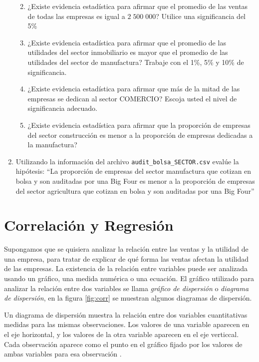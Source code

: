 \documentclass[letterpaper,]{book}
\providecommand{\tightlist}{%
  \setlength{\itemsep}{0pt}\setlength{\parskip}{0pt}}
\begin{document}
\begin{enumerate}
  \begin{enumerate}
  \def\labelenumii{\alph{enumii}.}
  \tightlist
  \item
    ¿Existe evidencia estadística para afirmar que el promedio de las ventas de todas las empresas es igual a \(2\;500\;000\)? Utilice una significancia del 5\%
  \item
    ¿Existe evidencia estadística para afirmar que el promedio de las utilidades del sector inmobiliario es mayor que el promedio de las utilidades del sector de manufactura? Trabaje con el 1\%, 5\% y 10\% de significancia.
  \item
    ¿Existe evidencia estadística para afirmar que más de la mitad de las empresas se dedican al sector COMERCIO? Escoja usted el nivel de significancia adecuado.
  \item
    ¿Existe evidencia estadística para afirmar que la proporción de empresas del sector construcción es menor a la proporción de empresas dedicadas a la manufactura?
  \end{enumerate}
\item
  Utilizando la información del archivo \texttt{audit\_bolsa\_SECTOR.csv} evalúe la hipótesis: ``La proporción de empresas del sector manufactura que cotizan en bolsa y son auditadas por una Big Four es menor a la proporción de empresas del sector agricultura que cotizan en bolsa y son auditadas por una Big Four''
\end{enumerate}

\hypertarget{methods}{%
\chapter{Correlación y Regresión}\label{methods}}

Supongamos que se quisiera analizar la relación entre las ventas y la utilidad de una empresa, para tratar de explicar de qué forma las ventas afectan la utilidad de las empresas. La existencia de la relación entre variables puede ser analizada usando un gráfico, una medida numérica o una ecuación.
El gráfico utilizado para analizar la relación entre dos variables se llama \emph{gráfico de dispersión} o \emph{diagrama de dispersión}, en la figura \ref{fig:corr} se muestran algunos diagramas de dispersión.

Un diagrama de dispersión muestra la relación entre dos variables cuantitativas medidas para las mismas observaciones. Los valores de una variable aparecen en el eje horizontal, y los valores de la otra variable aparecen en el eje verticcal. Cada observación aparece como el punto en el gráfico fijado por los valores de ambas variables para esa observación .
\end{document}

